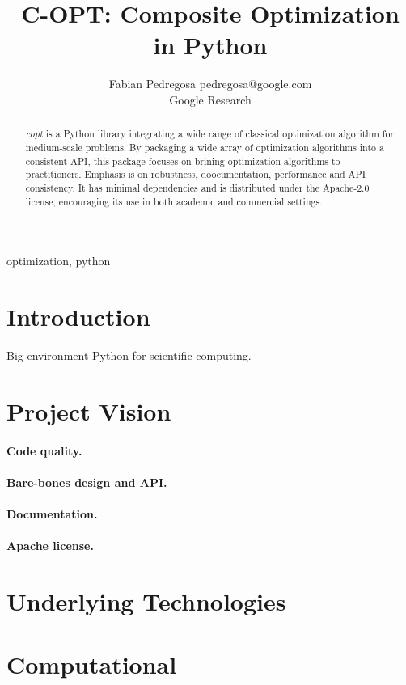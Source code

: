 \documentclass[twoside,11pt]{article}
\newcommand{\blue}{\color{blue}}
\begin{document}
\title{C-OPT: Composite Optimization in Python}
\author{\name Fabian Pedregosa \email pedregosa@google.com \\
       \addr Google Research\\
}
\editor{}


\maketitle


\begin{abstract}
\emph{copt} is a Python library integrating a wide range of classical optimization algorithm for medium-scale problems. By packaging a wide array of optimization algorithms into a consistent API, this package focuses on brining optimization algorithms to practitioners. Emphasis is on robustness, doocumentation, performance and API consistency. It has minimal dependencies and is distributed under the Apache-2.0 license, encouraging its use in both academic and commercial settings.
\end{abstract}

\begin{keywords}
  optimization, python
\end{keywords}

\section{Introduction}

{\blue Big environment Python for scientific computing. \newcommand{\blue}{\color{blue}}
}

\section{Project Vision}

\paragraph{Code quality.}

\paragraph{Bare-bones design and API.}

\paragraph{Documentation.}

\paragraph{Apache license.}


\section{Underlying Technologies}

\citep{virtanen2019scipy}

\citep{pedregosa2011scikit}

\section{Computational}


\end{document}
